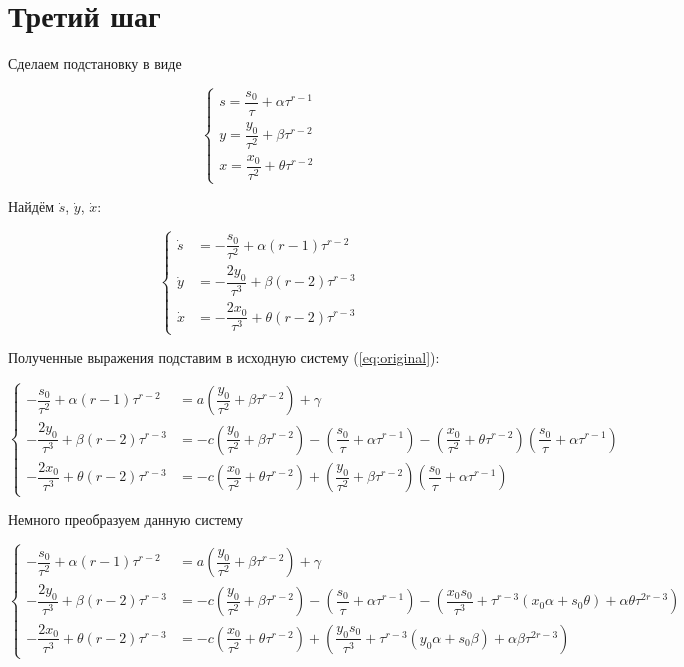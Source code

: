 \section{Третий шаг}

Сделаем подстановку в виде

$$
	\left\{
		\begin{aligned}
			s = \dfrac{s_0}{\tau} + \alpha \tau^{r-1} \\
			y = \dfrac{y_0}{\tau^2} + \beta \tau^{r-2} \\
			x = \dfrac{x_0}{\tau^2} + \theta \tau^{r-2} 
		\end{aligned}
	\right.
$$

Найдём $ \dot s $, $ \dot y $, $ \dot x $:

$$
	\left\{
		\begin{aligned}
			\dot s &= -\dfrac{s_0}{\tau^{2}} + \alpha (r-1) \tau^{r-2} \\
			\dot y &= -\dfrac{2y_0}{\tau^{3}} + \beta (r-2) \tau^{r-3} \\
			\dot x &= -\dfrac{2x_0}{\tau^{3}} + \theta (r-2) \tau^{r-3}
		\end{aligned}
	\right.
$$

Полученные выражения подставим в исходную систему (\ref{eq:original}):

\begin{equation*}
\label{eq:step3}
	\left\{
		\begin{aligned}
			-\dfrac{s_0}{\tau^{2}} + \alpha (r-1) \tau^{r-2} &= a \left( \dfrac{y_0}{\tau^2} + \beta \tau^{r-2} \right) + \gamma \\
			-\dfrac{2y_0}{\tau^{3}} + \beta (r-2) \tau^{r-3} &= -c \left( \dfrac{y_0}{\tau^2} + \beta \tau^{r-2} \right) - \left( \dfrac{s_0}{\tau} + \alpha \tau^{r-1} \right) - \left( \dfrac{x_0}{\tau^2} + \theta \tau^{r-2} \right) \left( \dfrac{s_0}{\tau} + \alpha \tau^{r-1} \right) \\
			-\dfrac{2x_0}{\tau^{3}} + \theta (r-2) \tau^{r-3} &= -c \left( \dfrac{x_0}{\tau^2} + \theta \tau^{r-2} \right) + \left( \dfrac{y_0}{\tau^2} + \beta \tau^{r-2} \right) \left( \dfrac{s_0}{\tau} + \alpha \tau^{r-1} \right)
		\end{aligned}
	\right.
\end{equation*}

Немного преобразуем данную систему

$$
	\left\{
		\begin{aligned}
			-\dfrac{s_0}{\tau^{2}} + \alpha (r-1) \tau^{r-2} &= a \left( \dfrac{y_0}{\tau^2} + \beta \tau^{r-2} \right) + \gamma \\
			-\dfrac{2y_0}{\tau^{3}} + \beta (r-2) \tau^{r-3} &= -c \left( \dfrac{y_0}{\tau^2} + \beta \tau^{r-2} \right) - \left( \dfrac{s_0}{\tau} + \alpha \tau^{r-1} \right) - \left( \dfrac{x_0s_0}{\tau^3} + \tau^{r-3}(x_0\alpha + s_0\theta) + \alpha\theta\tau^{2r-3} \right) \\
			-\dfrac{2x_0}{\tau^{3}} + \theta (r-2) \tau^{r-3} &= -c \left( \dfrac{x_0}{\tau^2} + \theta \tau^{r-2} \right) + \left( \dfrac{y_0s_0}{\tau^3} + \tau^{r-3}(y_0\alpha + s_0\beta) + \alpha\beta\tau^{2r-3} \right)
		\end{aligned}
	\right.
$$

